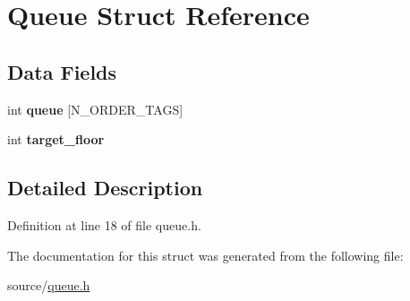 \hypertarget{structQueue}{}\section{Queue Struct Reference}
\label{structQueue}
\subsection*{Data Fields}
\begin{DoxyCompactItemize}
\item 
int {\bfseries queue} \mbox{[}N\+\_\+\+O\+R\+D\+E\+R\+\_\+\+T\+A\+GS\mbox{]}\hypertarget{structQueue_a5009d22561b0a1f0b94883331e98337f}{}\label{structQueue_a5009d22561b0a1f0b94883331e98337f}

\item 
int {\bfseries target\+\_\+floor}\hypertarget{structQueue_a95698e7080ed2265155b7bad70e7cdd7}{}\label{structQueue_a95698e7080ed2265155b7bad70e7cdd7}

\end{DoxyCompactItemize}


\subsection{Detailed Description}


Definition at line 18 of file queue.\+h.



The documentation for this struct was generated from the following file\+:\begin{DoxyCompactItemize}
\item 
source/\hyperlink{queue_8h}{queue.\+h}\end{DoxyCompactItemize}
